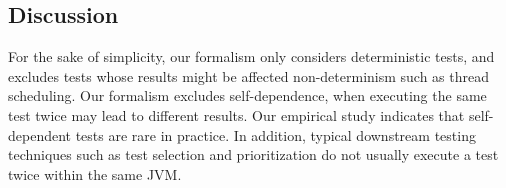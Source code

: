 \subsection{Discussion}
\label{sec:formaldiscussion}

For the sake of simplicity, our formalism only
considers deterministic tests,
and excludes tests whose results might be affected non-determinism such as thread scheduling.
Our formalism excludes self-dependence, 
when executing the same test twice
may lead to different results. Our empirical study
indicates that self-dependent tests
are rare in practice. In addition, typical
downstream testing techniques such as test selection and
prioritization do not usually execute a test twice within the same JVM.


